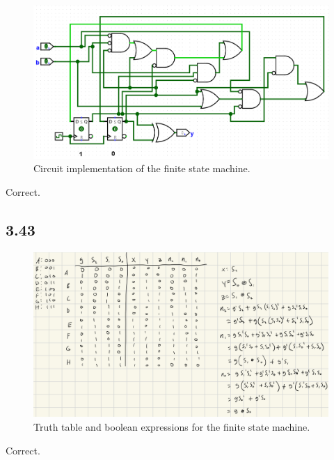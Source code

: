 \documentclass{article}
\begin{document}
\begin{figure}[H]
    \centering
    \includegraphics[width=\textwidth]{./images/3_40_circ.png}
    \caption*{Circuit implementation of the finite state machine.}
\end{figure}
\textcolor{mygreen}{Correct.}

\subsection*{3.43}
\begin{figure}[H]
    \centering
    \includegraphics[width=\textwidth]{./images/3_43.jpg}
    \caption*{Truth table and boolean expressions for the finite state machine.}
\end{figure}
\textcolor{mygreen}{Correct.}
\end{document}

